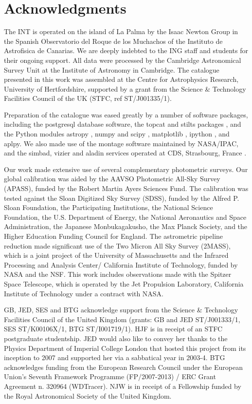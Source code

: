\documentclass[useAMS,usenatbib]{mn2e}
\begin{document}
\section*{Acknowledgments}

The INT is operated on the island of La Palma
by the Isaac Newton Group
in the Spanish Observatorio del Roque de los Muchachos
of the Instituto de Astrofisica de Canarias.
We are deeply indebted to the ING staff and students
for their ongoing support.
All data were processed 
by the Cambridge Astronomical Survey Unit
at the Institute of Astronomy in Cambridge.
The catalogue presented in this work was assembled
at the Centre for Astrophysics Research, University of Hertfordshire, supported by a grant from the Science \& Technology Facilities Council
of the UK (STFC, ref ST/J001335/1).

Preparation of the catalogue was eased greatly
by a number of software packages,
including the {\sc postgresql} database software,
the {\sc topcat} and {\sc stilts} packages \citep{Taylor2005,Taylor2006},
and the Python modules
{\sc astropy} \citep{Astropy},
{\sc numpy} and {\sc scipy} \citep{Numpy},
{\sc matplotlib} \citep{Matplotlib},
{\sc ipython} \citep{IPython},
and {\sc aplpy}.
We also made use of the {\sc montage} software maintained by NASA/IPAC,
and the {\sc simbad}, {\sc vizier} and {\sc aladin} services
operated at CDS, Strasbourg, France \citep{Aladin}.

Our work made extensive use of
several complementary photometric surveys.
Our global calibration was aided
by the AAVSO Photometric All-Sky Survey (APASS),
funded by the Robert Martin Ayers Sciences Fund.
The calibration was tested against the
Sloan Digitized Sky Survey (SDSS),
funded by the Alfred P. Sloan Foundation,
the Participating Institutions,
the National Science Foundation,
the U.S. Department of Energy,
the National Aeronautics and Space Administration,
the Japanese Monbukagakusho, the Max Planck Society,
and the Higher Education Funding Council for England.
The astrometric pipeline reduction made
significant use of the Two Micron All Sky Survey (2MASS),
which is a joint project 
of the University of Massachusetts
and the Infrared Processing and Analysis Center/
California Institute of Technology,
funded by NASA and the NSF.
This work includes observations made
with the Spitzer Space Telescope,
which is operated by the Jet Propulsion Laboratory,
California Institute of Technology under a contract with NASA. 

GB, JED, SES and BTG acknowledge support from the Science \& Technology
Facilities Council of the United Kingdom
(grants: GB and JED ST/J001333/1, SES ST/K00106X/1, BTG ST/I001719/1). 
HJF is in receipt of an STFC postgraduate studentship.  JED would also
like to convey her thanks to the Physics Department of Imperial College
London that hosted this project from its inception to 2007 and supported
her via a sabbatical year in 2003-4.  BTG acknowledges funding from the
European Research Council under the European Union's Seventh Framework
Programme (FP/2007-2013) / ERC Grant Agreement n. 320964 (WDTracer).
NJW is in receipt of a Fellowship funded by the Royal Astronomical Society
of the United Kingdom.
\end{document}
